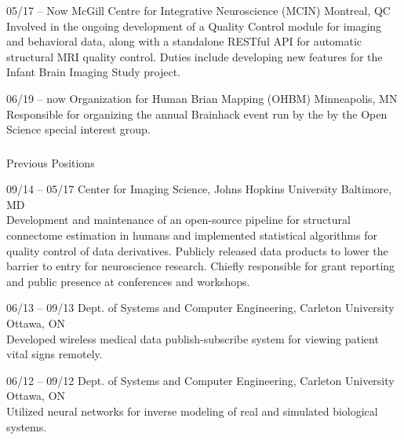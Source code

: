 \documentclass[]{friggeri-cv} %
\begin{document}
\begin{entrylist}
\entry
{05/17 -- Now}
{McGill Centre for Integrative Neuroscience (MCIN)}
{Montreal, QC}
{ \\
Involved in the ongoing development of a Quality Control module for imaging and
behavioral data, along with a standalone RESTful API for automatic structural MRI
quality control. Duties include developing new features for the Infant Brain Imaging
Study project.}



\begin{entrylist}
\entry
{06/19 -- now}
{Organization for Human Brian Mapping (OHBM)}
{Minneapolis, MN}
{ \\
Responsible for organizing the annual Brainhack event run by the by the Open Science special interest group.}
\end{entrylist}

\subsubsection{}{Previous Positions}

\begin{entrylist}
\entry
{09/14 -- 05/17}
{Center for Imaging Science, Johns Hopkins University}
{Baltimore, MD}
{\\
Development and maintenance of an open-source pipeline for structural connectome estimation in humans
and implemented statistical algorithms for quality control of data derivatives. Publicly released data
products to lower the barrier to entry for neuroscience research. Chiefly responsible for grant reporting
and public presence at conferences and workshops.}

\entry
{06/13 -- 09/13}
{Dept. of Systems and Computer Engineering, Carleton University}
{Ottawa, ON}
{\\
Developed wireless medical data publish-subscribe system for viewing patient vital signs remotely.}

\entry
{06/12 -- 09/12}
{Dept. of Systems and Computer Engineering, Carleton University}
{Ottawa, ON}
{\\
Utilized neural networks for inverse modeling of real and simulated biological systems.}


\end{entrylist}
\end{entrylist}
\end{document}
